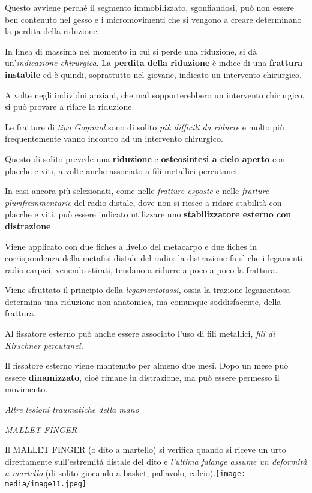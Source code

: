 \documentclass[]{article}
\begin{document}
Questo avviene perché il segmento immobilizzato, sgonfiandosi, può non
essere ben contenuto nel gesso e i micromovimenti che si vengono a
creare determinano la perdita della riduzione.

In linea di massima nel momento in cui si perde una riduzione, si dà
un'\emph{indicazione chirurgica}. La \textbf{perdita della riduzione} è
indice di una \textbf{frattura instabile} ed è quindi, soprattutto nel
giovane, indicato un intervento chirurgico.

A volte negli individui anziani, che mal sopporterebbero un intervento
chirurgico, si può provare a rifare la riduzione.

Le fratture di \emph{tipo Goyrand} sono di solito \emph{più difficili da
ridurre} e molto più frequentemente vanno incontro ad un intervento
chirurgico.

Questo di solito prevede una \textbf{riduzione} e \textbf{osteosintesi a
cielo aperto} con placche e viti, a volte anche associato a fili
metallici percutanei.

In casi ancora più selezionati, come nelle \emph{fratture esposte} e
nelle \emph{fratture pluriframmentarie} del radio distale, dove non si
riesce a ridare stabilità con placche e viti, può essere indicato
utilizzare uno \textbf{stabilizzatore esterno con distrazione}.

Viene applicato con due fiches a livello del metacarpo e due fiches in
corrispondenza della metafisi distale del radio: la distrazione fa sì
che i legamenti radio-carpici, venendo stirati, tendano a ridurre a poco
a poco la frattura.

Viene sfruttato il principio della \emph{legamentotassi}, ossia la
trazione legamentosa determina una riduzione non anatomica, ma comunque
soddisfacente, della frattura.

Al fissatore esterno può anche essere associato l'uso di fili metallici,
\emph{fili di Kirschner} \emph{percutanei}.

Il fissatore esterno viene mantenuto per almeno due mesi. Dopo un mese
può essere \textbf{dinamizzato}, cioè rimane in distrazione, ma può
essere permesso il movimento.

\emph{Altre lesioni traumatiche della mano}

\emph{MALLET FINGER}

Il MALLET FINGER (o dito a martello) si verifica quando si riceve un
urto direttamente sull'estremità distale del dito e \emph{l'ultima
falange assume un deformità a martello} (di solito giocando a basket,
pallavolo,
calcio).\texttt{[image: media/image11.jpeg]}
\end{document}
